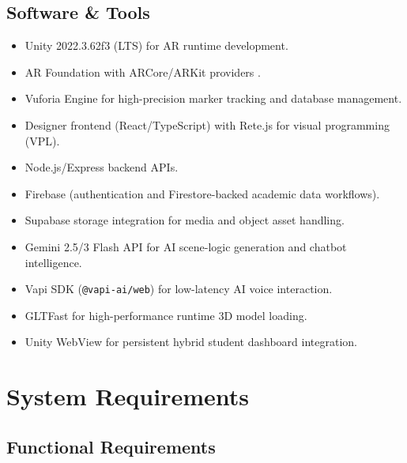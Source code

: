 \documentclass[12pt,a4paper]{article}
\begin{document}
\subsection{Software \& Tools}

\begin{itemize}[leftmargin=1.4cm]
  \item Unity 2022.3.62f3 (LTS) for AR runtime development.
  \item AR Foundation with ARCore/ARKit providers \cite{unityarfoundation}.
  \item Vuforia Engine for high-precision marker tracking and database management.
  \item Designer frontend (React/TypeScript) with Rete.js for visual programming (VPL).
  \item Node.js/Express backend APIs.
  \item Firebase (authentication and Firestore-backed academic data workflows).
  \item Supabase storage integration for media and object asset handling.
  \item Gemini 2.5/3 Flash API for AI scene-logic generation and chatbot intelligence.
  \item Vapi SDK (\texttt{@vapi-ai/web}) for low-latency AI voice interaction.
  \item GLTFast for high-performance runtime 3D model loading.
  \item Unity WebView for persistent hybrid student dashboard integration.
\end{itemize}

\section{System Requirements}

\subsection{Functional Requirements}
\end{document}
